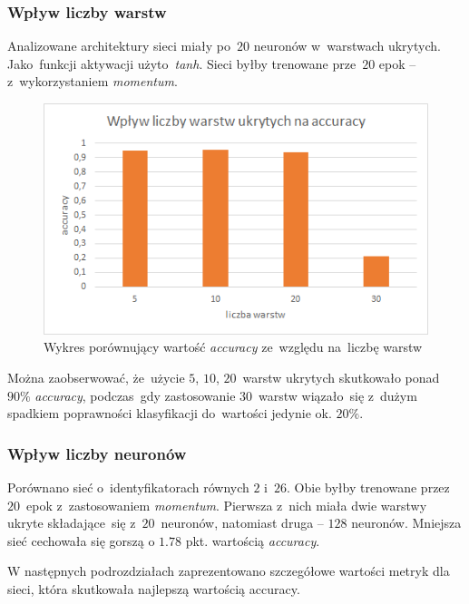 \documentclass[11pt, a4paper]{article}
\begin{document}
 \subsubsection{Wpływ liczby warstw}
 Analizowane architektury sieci miały po~$20$ neuronów w~warstwach ukrytych. Jako~funkcji aktywacji użyto~\textit{tanh}. Sieci byłby trenowane prze~$20$ epok -- z~wykorzystaniem \textit{momentum}.
 \begin{figure}[H]
  \centering
  \includegraphics[scale=0.8]{warstwy_nn.png}
  \caption{Wykres porównujący wartość \textit{accuracy} ze~względu na~liczbę warstw}
 \end{figure}

Można zaobserwować, że~użycie $5$, $10$, $20$~warstw ukrytych skutkowało ponad $90\%$ \textit{accuracy}, podczas~gdy zastosowanie $30$~warstw wiązało~się z~dużym spadkiem
poprawności klasyfikacji do~wartości jedynie ok. $20\%$.  
 
 \subsubsection{Wpływ liczby neuronów}
 Porównano sieć o~identyfikatorach równych $2$ i~$26$. Obie byłby trenowane przez~$20$~epok z~zastosowaniem \textit{momentum}.
 Pierwsza z~nich miała dwie warstwy ukryte składające~się z~$20$~neuronów, natomiast druga -- $128$ neuronów. Mniejsza sieć cechowała się gorszą o $1.78$ pkt. wartością \textit{accuracy}.
 
 \bigbreak
 W następnych podrozdziałach zaprezentowano szczegółowe wartości metryk dla sieci, która skutkowała najlepszą wartością accuracy.
\end{document}
